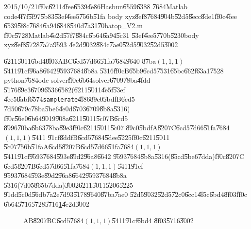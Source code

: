 2015/10/21\U{ff0c}\U{6211}\U{4fee}\U{6539}\U{4e86}Hasbun\U{6559}\U{6388}%
\U{7684}Matlab code\U{4f7f}\U{5f97}\U{5b83}\U{53ef}\U{4ee5}\U{756b}\U{51fa}%
body xyz\U{8ef8}\U{7684}\U{904b}\U{52d5}\U{8ecc}\U{8de1}\U{ff0c}\U{4fee}%
\U{6539}\U{5f8c}\U{7684}\U{6a94}\U{6848}\U{540d}\U{7a31}\U{70ba}top\_V2.m%
\U{ff0c}\U{5728}Matlab\U{4e2d}\U{57f7}\U{884c}\U{6b64}\U{6a94}\U{5c31}%
\U{53ef}\U{4ee5}\U{770b}\U{5230}body xyz\U{8ef8}\U{5728}\U{7a7a}\U{9593}%
\U{4e2d}\U{9032}\U{884c}\U{7ae0}\U{52d5}\U{9032}\U{52d5}\U{3002}

\clearpage%

\begin{case}
\U{6211}\U{5011}\U{6bd4}\U{8f03}ABC\U{6cd5}\U{7d66}\U{51fa}\U{7684}\U{9640}%
\U{87ba}$(1,1,1)$\U{5411}\U{91cf}\U{96a8}\U{6642}\U{9593}\U{7684}\U{8b8a}%
\U{5316}\U{ff0c}B\U{65b9}\U{6cd5}\U{7531}\U{65bc}\U{662f}\U{63a1}\U{7528}%
python\U{7684}ode solver\U{ff0c}\U{6b64}solver\U{6709}\U{78ba}\U{4fdd}%
\U{5176}\U{89e3}\U{6709}\U{6536}\U{6582}(\U{6211}\U{5011}\U{4e5f}\U{53ef}%
\U{4ee5}\U{8abf}\U{6574}\texttt{samplerate}\U{4f86}\U{89c0}\U{5bdf}B\U{6cd5}%
\U{7d50}\U{679c}\U{78ba}\U{5be6}\U{4e0d}\U{6703}\U{6709}\U{8b8a}\U{5316})%
\U{ff0c}\U{56e0}\U{6b64}\U{9019}\U{908a}\U{6211}\U{5011}\U{5c07}B\U{6cd5}%
\U{8996}\U{70ba}\U{6b63}\U{78ba}\U{89e3}\U{ff0c}\U{6211}\U{5011}\U{5c07}%
\U{89c0}\U{5bdf}A\U{8207}C\U{6cd5}\U{7d66}\U{51fa}\U{7684}$(1,1,1)$\U{5411}%
\U{91cf}\U{8ddf}B\U{6cd5}\U{7684}\U{5dee}\U{5225}\U{ff0c}\U{6211}\U{5011}%
\U{5c07}\U{756b}\U{51fa}A\U{6cd5}\U{8207}B\U{6cd5}\U{7d66}\U{51fa}\U{7684}$%
(1,1,1)$\U{5411}\U{91cf}\U{9593}\U{7684}\U{593e}\U{89d2}\U{96a8}\U{6642}%
\U{9593}\U{7684}\U{8b8a}\U{5316}(\U{85cd}\U{5be6}\U{7dda})\U{ff0c}\U{8207}C%
\U{6cd5}\U{8207}B\U{6cd5}\U{7d66}\U{51fa}\U{7684}$(1,1,1)$\U{5411}\U{91cf}%
\U{9593}\U{7684}\U{593e}\U{89d2}\U{96a8}\U{6642}\U{9593}\U{7684}\U{8b8a}%
\U{5316}(\U{7d05}\U{865b}\U{7dda})\U{3002}\U{6211}\U{5011}\U{5206}\U{5225}%
\U{91dd}\U{5c0d}\U{56db}\U{7a2e}\U{7d93}\U{5178}\U{9640}\U{87ba}\U{7ae0}%
\U{52d5}\U{9032}\U{52d5}\U{72c0}\U{6cc1}\U{4f5c}\U{6bd4}\U{8f03}\U{ff0c}%
\U{6b64}\U{5716}\U{5728}\U{5716}\ref{ABCcompareFig}\U{4e2d}\U{3002}
\end{case}

\begin{figure}[th]
\caption{AB\U{8207}BC\U{6cd5}\U{7684}$(1,1,1)$\U{5411}\U{91cf}\U{6bd4}%
\U{8f03}\U{5716}\U{3002}}
\label{ABCcompareFig}
\begin{center}

\end{center}
\end{figure}

